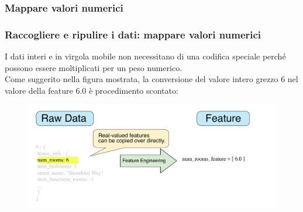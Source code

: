 \subsubsection[Mappare valori numerici]{Mappare valori numerici}
\begin{frame}

	\frametitle{{\color{GradientDescentDiagramBlue}Raccogliere e ripulire i dati}: mappare valori numerici}

		I dati interi e in virgola mobile non necessitano di una codifica speciale perché possono essere moltiplicati per un peso numerico.\\
		Come suggerito nella figura mostrata, la conversione del valore intero grezzo 6 nel valore della feature 6.0 è procedimento scontato:
		\begin{figure}[!htbp]
			\centering
			\includegraphics[width=1.0\linewidth]{images/data_prep/feature_engineering_and_data_cleaning/FloatingPointFeatures.pdf}
		\end{figure}


\end{frame}


